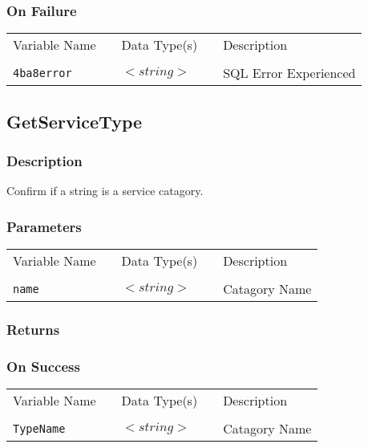 \subsubsection{On Failure}

\begin{tabular}{lllll}
Variable Name	&		&	Data Type(s)		&	&	Description	\\
				&	&	&	&	\\
\verb!4ba8error! & \hspace{15mm} & $<string>$ & \hspace{15mm} & SQL Error Experienced \\
\end{tabular}


\subsection{GetServiceType}

\subsubsection{Description}

Confirm if a string is a service catagory.

\subsubsection{Parameters}

\begin{tabular}{lllll}
Variable Name	&		&	Data Type(s)		&	&	Description	\\
				&	&	&	&	\\
\verb!name! & \hspace{15mm} & $<string>$ & \hspace{15mm} & Catagory Name \\
\end{tabular}

\subsubsection{Returns}

\subsubsection{On Success}

\begin{tabular}{lllll}
Variable Name	&		&	Data Type(s)		&	&	Description	\\
				&	&	&	&	\\
\verb!TypeName! & \hspace{15mm} & $<string>$ & \hspace{15mm} & Catagory Name \\
\end{tabular}
